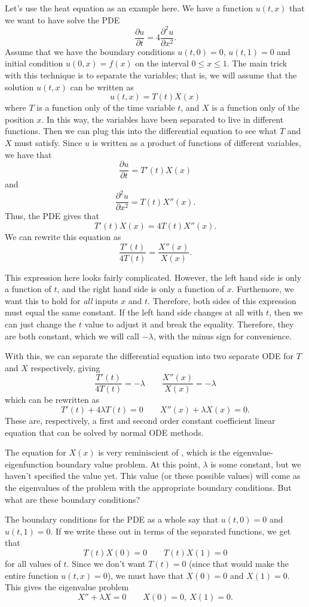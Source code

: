 Let's use the heat equation as an example here. We have a function $u(t,x)$ that we want to have solve the PDE
\[ \frac{\partial u}{\partial t} = 4 \frac{\partial^2u}{\partial x^2}. \] Assume that we have the boundary conditions $u(t,0) = 0$, $u(t,1) = 0$ and initial condition $u(0, x) = f(x)$ on the interval $0 \leq x \leq 1$. The main trick with this technique is to separate the variables; that is, we will assume that the solution $u(t,x)$ can be written as
\[ u(t,x) = T(t) X(x) \] where $T$ is a function only of the time variable $t$, and $X$ is a function only of the position $x$. In this way, the variables have been separated to live in different functions. Then we can plug this into the differential equation to see what $T$ and $X$ must satisfy. Since $u$ is written as a product of functions of different variables, we have that
\[ \frac{\partial u}{\partial t} = T'(t)X(x) \] and 
\[ \frac{\partial^2 u}{\partial x^2} = T(t)X''(x). \] Thus, the PDE gives that
\[ T'(t)X(x) = 4T(t)X''(x). \] We can rewrite this equation as
\[ \frac{T'(t)}{4T(t)} = \frac{X''(x)}{X(x)}.\]

This expression here looks fairly complicated. However, the left hand side is only a function of $t$, and the right hand side is only a function of $x$. Furthemore, we want this to hold for \emph{all} inputs $x$ and $t$. Therefore, both sides of this expression must equal the same constant. If the left hand side changes at all with $t$, then we can just change the $t$ value to adjust it and break the equality. Therefore, they are both constant, which we will call $-\lambda$, with the minus sign for convenience. 

With this, we can separate the differential equation into two separate ODE for $T$ and $X$ respectively, giving
\[ \frac{T'(t)}{4T(t)} = -\lambda \qquad \frac{X''(x)}{X(x)} = -\lambda \] which can be rewritten as 
\[ T'(t) + 4\lambda T(t) = 0 \qquad X''(x) + \lambda X(x) = 0. \] These are, respectively, a first and second order constant coefficient linear equation that can be solved by normal ODE methods. 

The equation for $X(x)$ is very reminiscient of , which is the eigenvalue-eigenfunction boundary value problem. At this point, $\lambda$ is some constant, but we haven't specified the value yet. This value (or these possible values) will come as the eigenvalues of the problem with the appropriate boundary conditions. But what are these boundary conditions?

The boundary conditions for the PDE as a whole say that $u(t,0) = 0$ and $u(t,1) = 0$. If we write these out in terms of the separated functions, we get that
\[ T(t)X(0) = 0 \qquad T(t)X(1) = 0 \] for all values of $t$. Since we don't want $T(t) = 0$ (since that would make the entire function $u(t,x) = 0$), we must have that $X(0) = 0$ and $X(1) = 0$. This gives the eigenvalue problem
\[ X'' + \lambda X = 0 \qquad X(0) = 0,\ X(1) = 0. \]

